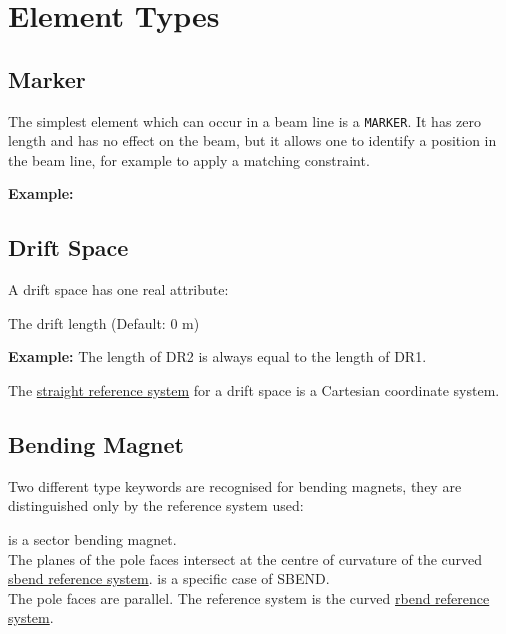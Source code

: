 \chapter{Element Types}
\label{chap:elements}

\section{Marker}
\label{sec:marker}

The simplest element which can occur in a beam line is a
\texttt{MARKER}. It has zero length and has no effect on the beam, but
it allows one to identify a position in the beam line, for example to
apply a matching constraint.

\textbf{Example:}


\section{Drift Space}
\label{sec:drift}


A drift space has one real attribute:
\begin{madlist}
    The drift length (Default: 0 m)
\end{madlist}

\textbf{Example:}
The length of DR2 is always equal to the length of DR1.

The \hyperref[subsec:local-straight]{straight reference system} for a drift
space is a Cartesian coordinate system.


\section{Bending Magnet}
\label{sec:bend}
Two different type keywords are recognised for bending magnets, they are
distinguished only by the reference system used:
\begin{madlist}
  \label{bend-sbend} is a sector bending magnet. \\
  The planes of the pole faces intersect at the centre of curvature of
  the curved \hyperref[subsec:local-rbend]{sbend reference system}.
  \label{bend-rbend} is a specific case of SBEND. \\
  The pole faces are parallel. The reference system is the curved
  \hyperref[subsec:local-rbend]{rbend reference system}.
\end{madlist}

